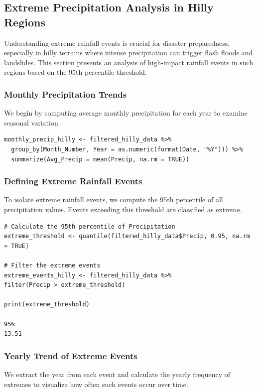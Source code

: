 \subsection*{Extreme Precipitation Analysis in Hilly Regions}

Understanding extreme rainfall events is crucial for disaster preparedness, especially in hilly terrains where intense precipitation can trigger flash floods and landslides. This section presents an analysis of high-impact rainfall events in such regions based on the 95th percentile threshold.

\subsubsection*{Monthly Precipitation Trends}

We begin by computing average monthly precipitation for each year to examine seasonal variation.

\begin{verbatim}
monthly_precip_hilly <- filtered_hilly_data %>%
  group_by(Month_Number, Year = as.numeric(format(Date, "%Y"))) %>%
  summarize(Avg_Precip = mean(Precip, na.rm = TRUE))
\end{verbatim}

\subsubsection*{Defining Extreme Rainfall Events}

To isolate extreme rainfall events, we compute the 95th percentile of all precipitation values. Events exceeding this threshold are classified as extreme.

\begin{verbatim}
# Calculate the 95th percentile of Precipitation
extreme_threshold <- quantile(filtered_hilly_data$Precip, 0.95, na.rm = TRUE)

# Filter the extreme events
extreme_events_hilly <- filtered_hilly_data %>%
filter(Precip > extreme_threshold)

print(extreme_threshold)

95%
13.51
\end{verbatim}

\subsubsection*{Yearly Trend of Extreme Events}

We extract the year from each event and calculate the yearly frequency of extremes to visualize how often such events occur over time.

